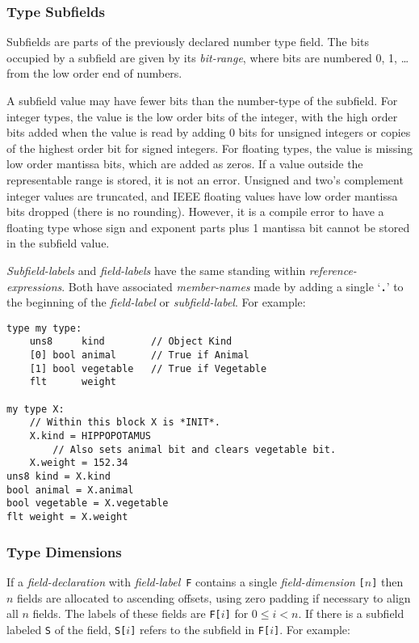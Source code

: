 \documentclass[12pt]{article}
\newcommand{\TT}[1]{{\tt \bfseries #1}}
\newenvironment{indpar}[1][0.3in]%
	{\begin{list}{}%
		     {\setlength{\itemsep}{0in}%
		      \setlength{\topsep}{0in}%
		      \setlength{\parsep}{1ex}%
		      \setlength{\labelwidth}{#1}%
		      \setlength{\leftmargin}{#1}%
		      \addtolength{\leftmargin}{\labelsep}}%
	 \item}%
	{\end{list}}
\begin{document}
\subsubsection{Type Subfields}

Subfields are parts of the previously declared number type field.
The bits occupied
by a subfield are given by its {\em bit-range}, where bits are numbered
0, 1, \ldots{} from the low order end of numbers.

A subfield value may have fewer bits than the number-type of the subfield.
For integer types, the value is the low order bits of the integer, with
the high order bits added when the value is read by adding 0 bits
for unsigned integers or copies of the highest order bit for signed integers.
For floating types, the value is missing low order mantissa bits, which
are added as zeros.  If a value outside the representable range is stored,
it is not an error.  Unsigned and two's complement
integer values are truncated, and IEEE floating values
have low order mantissa bits dropped (there is no rounding).  However, it is
a compile error to have a floating type whose sign and exponent parts plus
1 mantissa bit cannot be stored in the subfield value.

{\em Subfield-labels} and {\em field-labels} have the same standing within
{\em reference-expressions}.
Both have associated {\em member-names} made by adding a single
`\TT{.}' to the beginning of the {\em field-label} or {\em subfield-label}.
For example:

\begin{indpar}\begin{verbatim}
type my type:
    uns8     kind        // Object Kind
    [0] bool animal      // True if Animal
    [1] bool vegetable   // True if Vegetable
    flt      weight

my type X:
    // Within this block X is *INIT*.
    X.kind = HIPPOPOTAMUS
        // Also sets animal bit and clears vegetable bit.
    X.weight = 152.34
uns8 kind = X.kind
bool animal = X.animal
bool vegetable = X.vegetable
flt weight = X.weight
\end{verbatim}\end{indpar}

\subsubsection{Type Dimensions}

If a {\em field-declaration} with {\em field-label}\, {\tt F} contains 
a single {\em field-dimension} {\tt [$n$]} then $n$ fields are
allocated to ascending offsets, using zero padding
if necessary to align all $n$ fields.  The labels of these
fields are {\tt F[$i$]} for $0\le i<n$.  If there is a subfield
labeled {\tt S} of the field, {\tt S[$i$]} refers to the
subfield in {\tt F[$i$]}.  For example:
\end{document}
